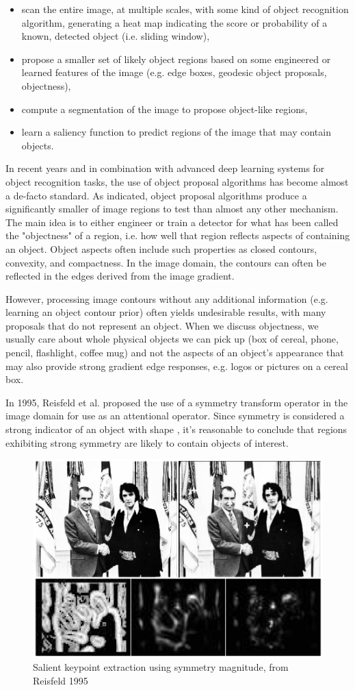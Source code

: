 \begin{itemize}
\item scan the entire image, at multiple scales, with some kind of object recognition algorithm, generating a heat map indicating the score or probability of a known, detected object (i.e. sliding window),
\item propose a smaller set of likely object regions based on some engineered or learned features of the image (e.g. edge boxes, geodesic object proposals, objectness),
\item compute a segmentation of the image to propose object-like regions,
\item learn a saliency function to predict regions of the image that may contain objects.
\end{itemize}

In recent years and in combination with advanced deep learning systems for object recognition tasks, the use of object proposal algorithms has become almost a de-facto standard. As indicated, object proposal algorithms produce a significantly smaller of image regions to test than almost any other mechanism. The main idea is to either engineer or train a detector for what has been called the "objectness" of a region, i.e. how well that region reflects aspects of containing an object. Object aspects often include such properties as closed contours, convexity, and compactness. In the image domain, the contours can often be reflected in the edges derived from the image gradient.

However, processing image contours without any additional information (e.g. learning an object contour prior) often yields undesirable results, with many proposals that do not represent an object. When we discuss objectness, we usually care about whole physical objects we can pick up (box of cereal, phone, pencil, flashlight, coffee mug) and not the aspects of an object's appearance that may also provide strong gradient edge responses, e.g. logos or pictures on a cereal box.

In 1995, Reisfeld et al. proposed the use of a symmetry transform operator in the image domain for use as an attentional operator. Since symmetry is considered a strong indicator of an object with shape \cite{reisfeld_robust_1992,dickinson_symmetry_2013}, it's reasonable to conclude that regions exhibiting strong symmetry are likely to contain objects of interest.

\begin{figure}[htbp]
\centering
\includegraphics[width=0.5\linewidth]{Introduction/elvis.png}
\caption{\label{fig:salient}
Salient keypoint extraction using symmetry magnitude, from Reisfeld 1995}
\end{figure}

